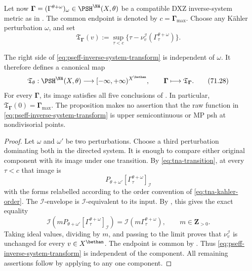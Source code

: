 Let now
$\boldsymbol\Gamma=(\Gamma^{\theta+\omega})_\omega\in
\PSH^{\NA}(X,\theta)$ be a compatible DXZ inverse-system metric as in
.  The common endpoint is denoted by
$c=\boldsymbol\Gamma_{\max}$.  Choose any K\"ahler perturbation
$\omega$, and set
\[
 \mathfrak T_{\boldsymbol\Gamma}(v)
 :=\sup_{\tau<c}
   \{\tau-\nu_v^{\mathcal I}
       (\Gamma^{\theta+\omega}_\tau)\}.
\tag{71.27}\label{eq:pseff-inverse-system-transform}
\]

\begin{proposition}\label{thm:pseff-perturbation-independent-transform}
The right side of \eqref{eq:pseff-inverse-system-transform} is independent
of \(\omega\).  It therefore defines a canonical map
\[
 \mathfrak T_\theta:
 \PSH^{\NA}(X,\theta)
 \longrightarrow[-\infty,+\infty)^{X^{\bethan}},
 \qquad
 \boldsymbol\Gamma\longmapsto
 \mathfrak T_{\boldsymbol\Gamma}.
\tag{71.28}\label{eq:pseff-canonical-transform-map}
\]
For every \(\boldsymbol\Gamma\), its image satisfies all five conclusions
of .  In particular,
\(\mathfrak T_{\boldsymbol\Gamma}(0)=\boldsymbol\Gamma_{\max}\).
The proposition makes no assertion that the raw function in
\eqref{eq:pseff-inverse-system-transform} is upper semicontinuous or MP
psh at nondivisorial points.
\end{proposition}

\begin{proof}
Let \(\omega\) and \(\omega'\) be two perturbations.  Choose a third
perturbation dominating both in the directed system.  It is enough to
compare either original component with its image under one transition.
By \eqref{eq:tna-transition}, at every \(\tau<c\) that image is
\[
 P_{\theta+\omega'}
 [\Gamma^{\theta+\omega}_\tau]_{\mathcal I}
\tag{71.29}\label{eq:pseff-transition-level}
\]
with the forms relabelled according to the order convention of
\eqref{eq:tna-kahler-order}.  The \(\mathcal I\)-envelope is
\(\mathcal I\)-equivalent to its input.  By
, this gives the exact equality
\[
 \mathcal I\!\left(mP_{\theta+\omega'}
 [\Gamma^{\theta+\omega}_\tau]_{\mathcal I}\right)
 =\mathcal I(m\Gamma^{\theta+\omega}_\tau),
 \qquad m\in\mathbf Z_{>0}.
\tag{71.30}\label{eq:pseff-transition-ideal-equality}
\]
Taking ideal values, dividing by \(m\), and passing to the limit proves
that \(\nu_v^{\mathcal I}\) is unchanged for every
\(v\in X^{\bethan}\).  The endpoint is common by
.  Thus
\eqref{eq:pseff-inverse-system-transform} is independent of the
component.  All remaining assertions follow by applying
 to any one component.
\end{proof}

